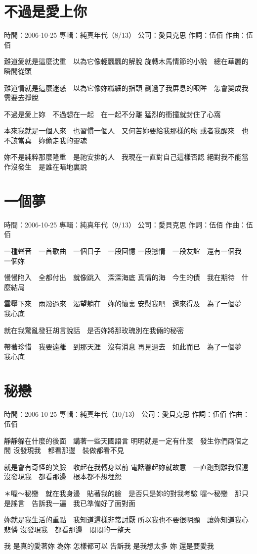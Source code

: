 \documentclass[UTF8,a4paper,oneside,twocolumn,12pt]{ctexbook}
\newcommand{\infopair}[2]{\textbullet #1：#2}
\newcommand{\zc}[1][伍佰]{\infopair{作詞}{#1}}
\newcommand{\zq}[1][伍佰]{\infopair{作曲}{#1}}
\newcommand{\zj}[1]{\infopair{專輯}{#1}}
\newcommand{\sj}[1]{\infopair{時間}{#1}}
\newcommand{\gs}[1]{\infopair{公司}{#1}}
\newenvironment{info}{\begin{flushleft}\kaishu
	}
	{\end{flushleft}\normalsize\yahei\par}
\newenvironment{lyric}{
	}
{}
\begin{document}
\section{不過是愛上你}
\begin{info}
	\sj{2006-10-25}
	\zj{純真年代（8/13）}
	\gs{愛貝克思}
	\zc
	\zq
\end{info}
\begin{lyric}
	難道愛就是這麼沈重　以為它像輕飄飄的解脫
	旋轉木馬情節的小說　總在華麗的瞬間從頭

	難道情就是這麼迷惑　以為它像妳纖細的指頭
	劃過了我屏息的眼眸　怎會變成我需要去掙脫

	不過是愛上妳　不過想在一起　在一起不分離
	猛烈的衝撞就封住了心窩

	本來我就是一個人來　也習慣一個人　又何苦妳要給我那樣的吻
	或者我醒來　也不該當真　妳偷走我的靈魂

	妳不是純粹那麼隆重　是祂安排的人　我現在一直對自己這樣否認
	絕對我不能當作沒發生　是誰在暗地裏說
\end{lyric}

\section{一個夢}
\begin{info}
	\sj{2006-10-25}
	\zj{純真年代（9/13）}
	\gs{愛貝克思}
	\zc
	\zq
\end{info}
\begin{lyric}
	一種聲音　一首歌曲　一個日子　一段回憶
	一段戀情　一段友誼　還有一個我　一個妳

	慢慢陷入　全都付出　就像跳入　深深海底
	真情的海　今生的債　我在期待　什麼結局

	雲壓下來　雨潑過來　渴望躺在　妳的懷裏
	安慰我吧　還來得及　為了一個夢　我心底

	就在我驚亂發狂胡言說話　是否妳將那玫瑰別在我倆的秘密

	帶著珍惜　我要遠離　到那天涯　沒有消息
	再見過去　如此而已　為了一個夢　我心底
\end{lyric}

\section{秘戀}
\begin{info}
	\sj{2006-10-25}
	\zj{純真年代（10/13）}
	\gs{愛貝克思}
	\zc
	\zq
\end{info}
\begin{lyric}
	靜靜躲在什麼的後面　講著一些天國語言
	明明就是一定有什麼　發生你們兩個之間
	沒發現我　都看那邊　裝做都看不見

	就是會有奇怪的笑臉　收起在我轉身以前
	電話響起妳就故意　一直跑到離我很遠
	沒發現我　都看那邊　根本都不想埋怨

	＊喔～秘戀　就在我身邊　貼著我的臉　是否只是妳的對我考驗
	喔～秘戀　那只是謠言　告訴我一遍　我已準備好了面對面

	妳就是我生活的重點　我知道這樣非常討厭
	所以我也不要很明顯　讓妳知道我心悲憐
	沒發現我　都看那邊　悶悶的一整天

	我 是真的愛著妳
	為妳 怎樣都可以
	告訴我 是我想太多
	妳 還是要愛我
\end{lyric}
\end{document}
